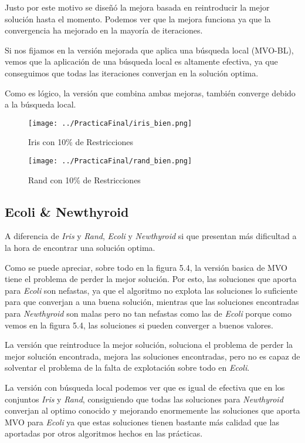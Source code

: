 Justo por este motivo se diseñó la mejora basada en reintroducir la mejor solución hasta el momento. Podemos ver que la mejora funciona ya que la convergencia ha mejorado en la mayoría de iteraciones.

Si nos fijamos en la versión mejorada que aplica una búsqueda local (MVO-BL), vemos que la aplicación de una búsqueda local es altamente efectiva, ya que conseguimos que todas las iteraciones converjan en la solución optima.

Como es lógico, la versión que combina ambas mejoras, también converge debido a la búsqueda local.

\begin{figure}[H]
   \centering
   \texttt{[image: ../PracticaFinal/iris\_bien.png]}
   \caption{Iris con 10\% de Restricciones}
\end{figure}

\begin{figure}[H]
   \centering
   \texttt{[image: ../PracticaFinal/rand\_bien.png]}
   \caption{Rand con 10\% de Restricciones}
\end{figure}

\newpage

\subsection{Ecoli \& Newthyroid}
A diferencia de \emph{Iris} y \emph{Rand}, \emph{Ecoli} y \emph{Newthyroid} si que presentan más dificultad a la hora de encontrar una solución optima.

Como se puede apreciar, sobre todo en la figura 5.4, la versión basica de MVO tiene el problema de perder la mejor solución. Por esto, las soluciones que aporta para \emph{Ecoli} son nefastas, ya que el algoritmo no explota las soluciones lo suficiente para que converjan a una buena solución, mientras que las soluciones encontradas para \emph{Newthyroid} son malas pero no tan nefastas como las de \emph{Ecoli} porque como vemos en la figura 5.4, las soluciones si pueden converger a buenos valores.

La versión que reintroduce la mejor solución, soluciona el problema de perder la mejor solución encontrada, mejora las soluciones encontradas, pero no es capaz de solventar el problema de la falta de explotación sobre todo en \emph{Ecoli}.

La versión con búsqueda local podemos ver que es igual de efectiva que en los conjuntos \emph{Iris} y \emph{Rand}, consiguiendo que todas las soluciones para \emph{Newthyroid} converjan al optimo conocido y mejorando enormemente las soluciones que aporta MVO para \emph{Ecoli} ya que estas soluciones tienen bastante más calidad que las aportadas por otros algoritmos hechos en las prácticas.

